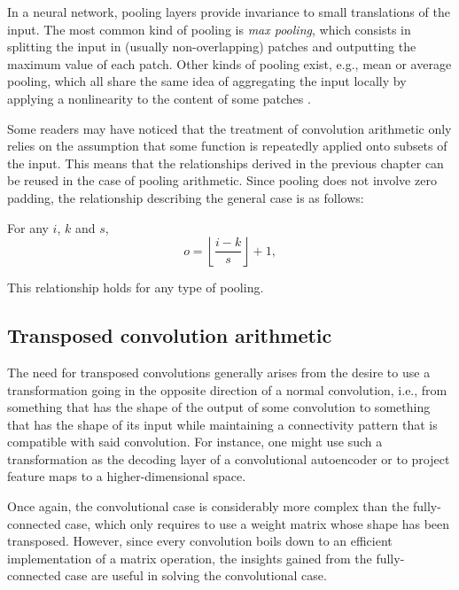 In a neural network, pooling layers provide invariance to small translations of
the input. The most common kind of pooling is \emph{max pooling}, which
consists in splitting the input in (usually non-overlapping) patches and
outputting the maximum value of each patch. Other kinds of pooling exist, e.g.,
mean or average pooling, which all share the same idea of aggregating the input
locally by applying a nonlinearity to the content of some patches \citep{%
boureau-cvpr-10,boureau-icml-10,boureau-iccv-11,ICML2011Saxe_551}.

Some readers may have noticed that the treatment of convolution arithmetic only
relies on the assumption that some function is repeatedly applied onto subsets
of the input. This means that the relationships derived in the previous chapter
can be reused in the case of pooling arithmetic. Since pooling does not involve
zero padding, the relationship describing the general case is as follows:

\begin{relationship}\label{rel:pooling}
For any $i$, $k$ and $s$,
\begin{equation*}
    o = \left\lfloor \frac{i - k}{s} \right\rfloor + 1,
\end{equation*}
\end{relationship}

\noindent This relationship holds for any type of pooling.

\subsection{Transposed convolution arithmetic}\label{sec:transposed_conv}

The need for transposed convolutions generally arises from the desire to use a
transformation going in the opposite direction of a normal convolution, i.e.,
from something that has the shape of the output of some convolution to
something that has the shape of its input while maintaining a connectivity
pattern that is compatible with said convolution. For instance, one might use
such a transformation as the decoding layer of a convolutional autoencoder or to
project feature maps to a higher-dimensional space.

Once again, the convolutional case is considerably more complex than the
fully-connected case, which only requires to use a weight matrix whose shape
has been transposed. However, since every convolution boils down to an
efficient implementation of a matrix operation, the insights gained from the
fully-connected case are useful in solving the convolutional case.


